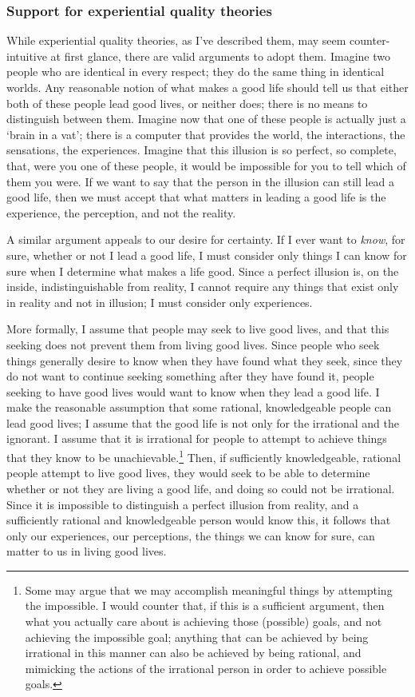 \documentclass[letterpaper,11pt,twoside]{article}
\begin{document}
  \subsubsection*{Support for experiential quality theories}
  While experiential quality theories, as I've described them, may seem counter-intuitive at first glance, there are valid arguments to adopt them.  Imagine two people who are identical in every respect; they do the same thing in identical worlds.  Any reasonable notion of what makes a good life should tell us that either both of these people lead good lives, or neither does; there is no means to distinguish between them.  Imagine now that one of these people is actually just a `brain in a vat'; there is a computer that provides the world, the interactions, the sensations, the experiences.  Imagine that this illusion is so perfect, so complete, that, were you one of these people, it would be impossible for you to tell which of them you were.  If we want to say that the person in the illusion can still lead a good life, then we must accept that what matters in leading a good life is the experience, the perception, and not the reality.

  A similar argument appeals to our desire for certainty.  If I ever want to \emph{know}, for sure, whether or not I lead a good life, I must consider only things I can know for sure when I determine what makes a life good.  Since a perfect illusion is, on the inside, indistinguishable from reality, I cannot require any things that exist only in reality and not in illusion; I must consider only experiences.

  More formally, I assume that people may seek to live good lives, and that this seeking does not prevent them from living good lives.  Since people who seek things generally desire to know when they have found what they seek, since they do not want to continue seeking something after they have found it, people seeking to have good lives would want to know when they lead a good life.  I make the reasonable assumption that some rational, knowledgeable people can lead good lives; I assume that the good life is not only for the irrational and the ignorant.  I assume that it is irrational for people to attempt to achieve things that they know to be unachievable.\footnote{Some may argue that we may accomplish meaningful things by attempting the impossible.  I would counter that, if this is a sufficient argument, then what you actually care about is achieving those (possible) goals, and not achieving the impossible goal; anything that can be achieved by being irrational in this manner can also be achieved by being rational, and mimicking the actions of the irrational person in order to achieve possible goals.}  Then, if sufficiently knowledgeable, rational people attempt to live good lives, they would seek to be able to determine whether or not they are living a good life, and doing so could not be irrational.  Since it is impossible to distinguish a perfect illusion from reality, and a sufficiently rational and knowledgeable person would know this, it follows that only our experiences, our perceptions, the things we can know for sure, can matter to us in living good lives.
\end{document}
